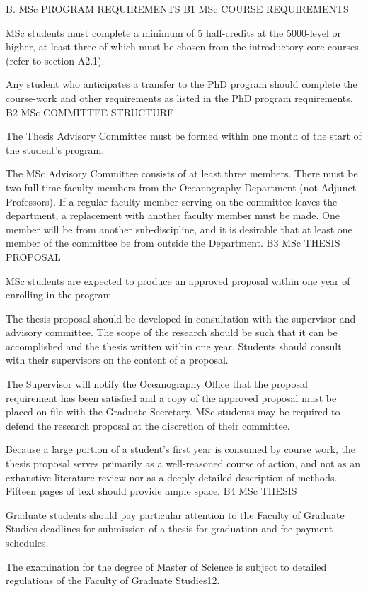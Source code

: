 B.	MSc  PROGRAM REQUIREMENTS
B1	MSc COURSE REQUIREMENTS

MSc students must complete a minimum of 5 half-credits at the 5000-level or higher, at least three of which must be chosen from the introductory core courses (refer to section A2.1).

Any student who anticipates a transfer to the PhD program should complete the course-work and other requirements as listed in the PhD program requirements.
B2	MSc COMMITTEE STRUCTURE

The Thesis Advisory Committee must be formed within one month of the start of the student’s program.

The MSc Advisory Committee consists of at least three members. There must be two full-time faculty members from the Oceanography Department (not Adjunct Professors). If a regular faculty member serving on the committee leaves the department, a replacement with another faculty member must be made. One member will be from another sub-discipline, and it is desirable that at least one member of the committee be from outside the Department.
B3	MSc THESIS PROPOSAL

MSc students are expected to produce an approved proposal within one year of enrolling in the program.

The thesis proposal should be developed in consultation with the supervisor and advisory committee. The scope of the research should be such that it can be accomplished and the thesis written within one year. Students should consult with their supervisors on the content of a proposal.

The Supervisor will notify the Oceanography Office that the proposal requirement has been satisfied and a copy of the approved proposal must be placed on file with the Graduate Secretary. MSc students may be required to defend the research proposal at the discretion of their committee.

Because a large portion of a student’s first year is consumed by course work, the thesis proposal serves primarily as a well-reasoned course of action, and not as an exhaustive literature review nor as a deeply detailed description of methods. Fifteen pages of text should provide ample space.
B4	MSc THESIS

Graduate students should pay particular attention to the Faculty of Graduate Studies deadlines for submission of a thesis for graduation and fee payment schedules.
 

The examination for the degree of Master of Science is subject to detailed regulations of the Faculty of Graduate Studies12.

